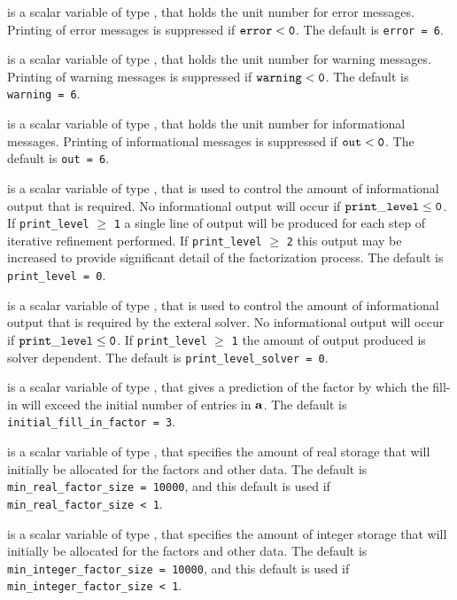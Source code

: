 \documentclass{galahad}
\begin{document}
\begin{description}

 is a scalar variable of type \integer, that holds the
unit number for error messages.
Printing of error messages is suppressed if ${\tt error} < {\tt 0}$.
The default is {\tt error = 6}.

 is a scalar variable of type \integer, that holds the
unit number for warning messages.
Printing of warning messages is suppressed if ${\tt warning} < {\tt 0}$.
The default is {\tt warning = 6}.

 is a scalar variable of type \integer, that holds the
unit number for informational messages.
Printing of informational messages is suppressed if ${\tt out} < {\tt 0}$.
The default is {\tt out = 6}.

 is a scalar variable of type \integer,
that is used
to control the amount of informational output that is required. No
informational output will occur if ${\tt print\_level} \leq {\tt 0}$. If
{\tt print\_level} $\geq$ {\tt 1} a single line of output will be produced
for each step of iterative refinement performed.
If {\tt print\_level} $\geq$ {\tt 2} this output
may be increased to provide significant detail of the factorization process.
The default is {\tt print\_level = 0}.

 is a scalar variable of type \integer,
that is used
to control the amount of informational output that is required by the exteral
solver. No
informational output will occur if ${\tt print\_level} \leq {\tt 0}$. If
{\tt print\_level} $\geq$ {\tt 1} the amount of output produced is solver
dependent.
The default is {\tt print\_level\_solver = 0}.

 is a scalar variable of type \integer,
that gives a prediction of the factor by which the fill-in will exceed
the initial number of entries in ${\mathbf{a}}$.
The default is {\tt initial\_fill\_in\_factor = 3}.

 is a scalar variable of type \integer,
that specifies the amount of real storage that will initially be
allocated for the factors and other data.
The default is {\tt min\_real\_factor\_size = 10000},
and this default is used if {\tt min\_real\_factor\_size < 1}.

 is a scalar variable of type \integer,
that specifies the amount of integer storage that will initially be
allocated for the factors and other data.
The default is {\tt min\_integer\_factor\_size = 10000},
and this default is used if {\tt min\_integer\_factor\_size < 1}.


\end{description}
\end{document}
